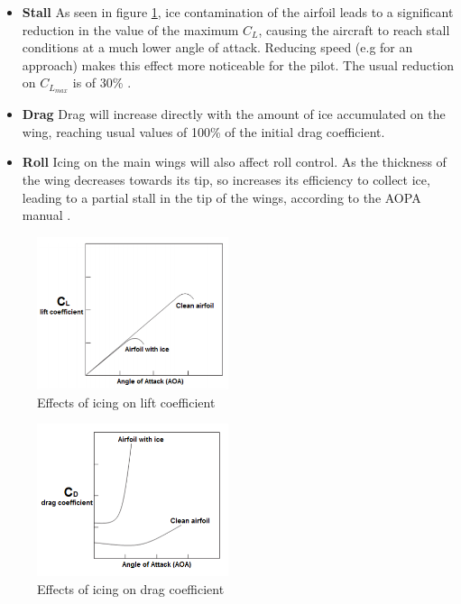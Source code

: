 \begin{itemize}
\item \textbf{Stall }As seen in figure \ref{fig:icing_lift}, ice contamination of the airfoil leads to a significant reduction in the value of the maximum $C_L$, causing the aircraft to reach stall conditions at a much lower angle of attack. Reducing speed (e.g for an approach) makes this effect more noticeable for the pilot. The usual reduction on $C_{L_{max}}$ is of 30\% \cite{icing_cond}.

\item \textbf{Drag }Drag will increase directly with the amount of ice accumulated on the wing, reaching usual values of 100\% of the initial drag coefficient.

\item \textbf{Roll }Icing on the main wings will also affect roll control. As the thickness of the wing decreases towards its tip, so increases its efficiency to collect ice, leading to a partial stall in the tip of the wings, according to the AOPA manual \cite{icing_aopa}.
\end{itemize}
\begin{figure}[H]
\centering
\includegraphics[width=0.5\textwidth]{Figures/Results/icing_lift.PNG}
\caption[Effects of icing on lift coefficient]{Effects of icing on lift coefficient \cite{icing_cond}}
\label{fig:icing_lift}
\end{figure}
\begin{figure}[H]
\centering
\includegraphics[width=0.5\textwidth]{Figures/Results/icing_drag.PNG}
\caption[Effects of icing on drag coefficient]{Effects of icing on drag coefficient \cite{icing_cond}}
\label{fig:icing_drag}
\end{figure}

